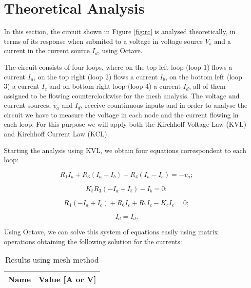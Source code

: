 \section{Theoretical Analysis}
\label{sec:analysis}

In this section, the circuit shown in Figure \ref{fig:rc} is analysed
theoretically, in terms of its response when submited to a voltage in
voltage source $V_a$ and a current in the current source $I_d$, using
Octave.

The circuit consists of four loops, where on the top left loop (loop 1) flows a current $I_a$,
on the top right (loop 2) flows a current $I_b$, on the bottom left (loop 3) a current $I_c$
and on bottom right loop (loop 4) a current $I_d$, all of them assigned to be flowing counterclockwise for
the mesh analysis. The voltage and current sources, $v_a$ and $I_d$, receive countinuous inputs and in order to analyse the circuit
we have to measure the voltage in each node and the current flowing in each loop.
For this purpose we will apply both the Kirchhoff Voltage Law (KVL) and Kirchhoff
Current Law (KCL). \par
Starting the analysis using KVL, we obtain four equations correspondent to each loop:

\begin{equation}
  R_1I_a + R_3(I_a - I_b) + R_4(I_a - I_c) = -v_a ;
  \label{eq:kvl1}
\end{equation}

\begin{equation}
  K_bR_3(-I_a + I_b) - I_b = 0;
  \label{eq:kvl2}
\end{equation}

\begin{equation}
  R_4(-I_a + I_c) + R_6I_c + R_7I_c - K_cI_c = 0;
  \label{eq:kvl3}
\end{equation}

\begin{equation}
  I_d = I_d.
  \label{eq:kvl4}
\end{equation}

Using Octave, we can solve this system of equations easily using matrix operations obtaining the following
solution for the currents:

\begin{table}[h]
  \centering
  \begin{tabular}{|l|r|}
    \hline    
    {\bf Name} & {\bf Value [A or V]} \\ \hline
    
  \end{tabular}
  \caption{Results using mesh method}
  \label{tab:tabela1}
\end{table}

